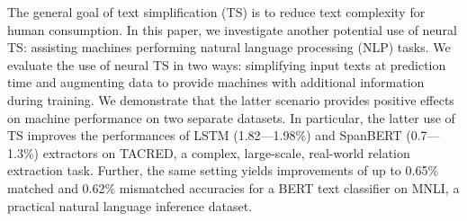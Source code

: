 The general goal of text simplification (TS) is to reduce text complexity for human consumption. In this paper,  we investigate another potential use of neural TS: assisting machines performing natural language processing (NLP) tasks. We evaluate the use of neural TS in two ways:   simplifying input texts at prediction time and augmenting data to provide machines with additional information during training.   We demonstrate that the latter scenario provides positive effects on machine performance on two separate datasets.  In particular,  the latter use of  TS  improves the performances of LSTM (1.82---1.98\%) and SpanBERT  (0.7---1.3\%)  extractors on  TACRED,  a complex, large-scale, real-world relation extraction task. Further, the same setting yields improvements of up to 0.65\% matched and 0.62\% mismatched accuracies for a BERT text classifier on MNLI,  a practical natural language inference dataset.
